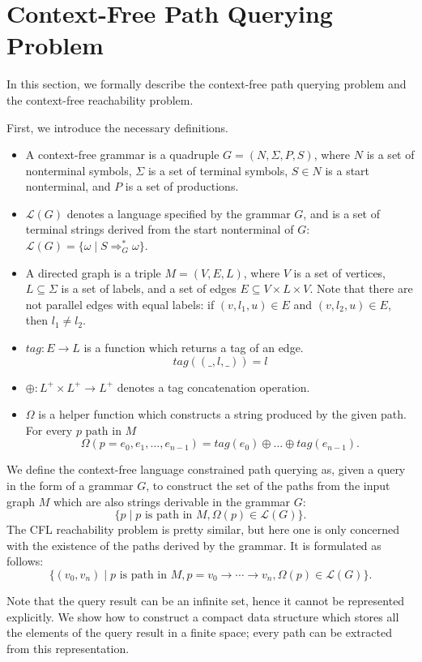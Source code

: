 \section{Context-Free Path Querying Problem}
\label{sec:CFPQ}

In this section, we formally describe the context-free path querying problem and the context-free reachability problem.

First, we introduce the necessary definitions.
\begin{itemize}
  \item A context-free grammar is a quadruple $G=(N, \Sigma, P, S)$, where $N$ is a set of nonterminal symbols, $\Sigma$ is a set of terminal symbols, $S \in N$ is a start nonterminal, and $P$ is a set of productions.
  \item $\mathcal{L}(G)$ denotes a language specified by the grammar $G$, and is a set of terminal strings derived from the start nonterminal of $G$: $\mathcal{L}(G) = \{\omega \mid S \Rightarrow_{G}^{*} \omega\}$.
  \item A directed graph is a triple $M = (V,E,L)$, where $V$ is a set of vertices, $L \subseteq \Sigma$ is a set of labels, and a set of edges $E\subseteq V\times L\times V$.
  Note that there are not parallel edges with equal labels: if $(v, l_1, u) \in E$ and $(v,l_2,u) \in E$, then $l_1 \neq l_2$.
  \item $tag: E \rightarrow L$ is a function which returns a tag of an edge. $$tag((\_,l,\_)) = l$$
  \item $\oplus: L^+ \times L^+ \rightarrow L^+$ denotes a tag concatenation operation.
  \item $\Omega$ is a helper function which constructs a string produced by the given path. For every $p \text{ path in } M$
  $$ \Omega(p = e_{0},e_{1},\dots,e_{n-1}) = tag (e_{0}) \oplus \dots \oplus tag (e_{n-1}).$$
\end{itemize}

We define the context-free language constrained path querying as, given a query in the form of a grammar $G$, to construct the set of the paths from the input graph $M$ which are also strings derivable in the grammar $G$: $$\{p \mid p \text{ is path in } M, \Omega(p) \in \mathcal{L}(G)\}.$$
The CFL reachability problem is pretty similar, but here one is only concerned with the existence of the paths derived by the grammar. It is formulated as follows: $$\{ (v_0,v_n) \mid p \text{ is path in } M, p = v_0 \rightarrow \cdots \rightarrow v_n, \Omega(p) \in \mathcal{L}(G)\}.$$

Note that the query result can be an infinite set, hence it cannot be represented explicitly.
We show how to construct a compact data structure which stores all the elements of the query result in a finite space; every path can be extracted from this representation.